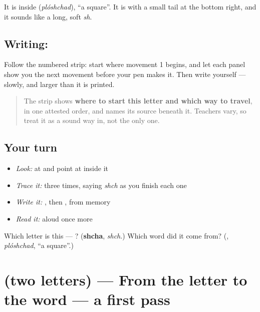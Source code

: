 It is inside \textbf{} (\emph{plóshchad}), \textquotedblleft{}a square\textquotedblright{}. It is \textbf{} with a small tail at the bottom right, and it sounds like a long, soft \emph{sh}.

\subsection*{Writing: }

Follow the numbered strip: start where movement 1 begins, and let each panel show you the next movement before your pen makes it. Then write  yourself — slowly, and larger than it is printed.

\begin{quote}
The strip shows \textbf{where to start this letter and which way to travel}, in one attested order, and names its source beneath it. Teachers vary, so treat it as a sound way in, not the only one.
\end{quote}

\subsection*{Your turn}
\begin{itemize}
\raggedright
  \item \emph{Look:} at \textbf{} and point at  inside it
  \item \emph{Trace it:}  three times, saying \emph{shch} as you finish each one
  \item \emph{Write it:} , then , from memory
  \item \emph{Read it:} \textbf{} aloud once more
\end{itemize}

\begin{tcolorbox}[breakable,colback=teal!4,colframe=teal!35!black,title={Before you move on}]
Which letter is this — ? (\textbf{shcha}, \emph{shch}.) Which word did it come from? (\textbf{}, \emph{plóshchad}, \textquotedblleft{}a square\textquotedblright{}.)
\end{tcolorbox}
\section[(two letters)]{(two letters) — From the letter to the word — a first pass}

